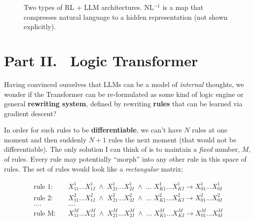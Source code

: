 \documentclass[runningheads]{llncs}
\begin{document}
\begin{figure}
\caption{Two types of RL + LLM architectures. NL${}^{-1}$ is a map that compresses natural language to a hidden representation (not shown explicitly).}
\end{figure}

\section*{Part II. \ Logic Transformer}

Having convinced ourselves that LLMs can be a model of \textit{internal} thoughts, we wonder if the Transformer can be re-formulated as some kind of logic engine or general \textbf{rewriting system}, defined by rewriting \textbf{rules} that can be learned via gradient descent?

In order for such rules to be \textbf{differentiable}, we can't have $N$ rules at one moment and then suddenly $N+1$ rules the next moment (that would not be differentiable).  The only solution I can think of is to maintain a \textit{fixed} number, $M$, of rules.  Every rule may potentially ``morph'' into any other rule in this space of rules.  The set of rules would look like a \textit{rectangular} matrix:

\begin{equation}
\begin{aligned}
\mbox{rule 1:} & \quad \boxed{X^1_{11}... X^1_{1I}} \;\wedge\; \boxed{X^1_{21} ... X^1_{2I}} \;\wedge\;...\; \boxed{X^1_{K1} ... X^1_{KI}} \rightarrow \boxed{X^1_{01} ... X^1_{0I}} \\
\mbox{rule 2:} & \quad \boxed{X^2_{11}... X^2_{1I}} \;\wedge\; \boxed{X^2_{21} ... X^2_{2I}} \;\wedge\;...\; \boxed{X^2_{K1} ... X^2_{KI}} \rightarrow \boxed{X^2_{01} ... X^2_{0I}} \\
.... & \quad .... \\
\mbox{rule M:} & \quad \boxed{X^M_{11}... X^M_{1I}} \;\wedge\; \boxed{X^M_{21} ... X^M_{2I}} \;\wedge\;...\; \boxed{X^M_{K1} ... X^M_{KI}} \rightarrow \boxed{X^M_{01} ... X^M_{0I}}
\end{aligned}
\end{equation}
\end{document}
